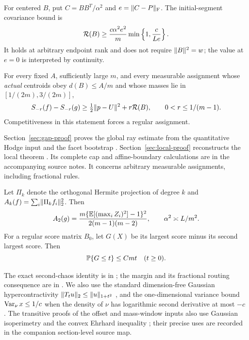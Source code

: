 \begin{prior}
\label{prior:local-global}
For centered $B$, put $C=BB^T/\alpha^2$ and $e=\lVert C-P\rVert_{\mathrm F}$.
The initial-segment covariance bound is
\begin{equation}\label{eq:global-covariance-floor}
 \mathcal R(B)\ge \frac{c\alpha^2e^2}{m}
                   \min\left\{1,\frac{c}{Le}\right\}.
\end{equation}
It holds at arbitrary endpoint rank and does not require
$\lVert B\rVert^2=w$; the value at $e=0$ is interpreted by continuity.

For every fixed $A$, sufficiently large $m$, and every measurable
assignment whose \emph{actual} centroids obey $d(B)\le A/m$ and whose
masses lie in $[1/(2m),3/(2m)]$,
\begin{equation}\label{eq:local-noise}
 S_{-r}(f)-S_{-r}(g)\ge \tfrac12\lVert p-U\rVert^2+r\mathcal R(B),
                   \qquad0<r\le1/(m-1).
\end{equation}
Competitiveness in this statement forces a regular assignment.
\end{prior}
Section~\ref{sec:gap-proof} proves the global ray estimate from the
quantitative Hodge input and the facet bootstrap \cite{currentgap}.
Section~\ref{sec:local-proof} reconstructs the local theorem
\cite{currentlocal}. Its complete cap and affine-boundary calculations are
in the accompanying source notes. It concerns arbitrary measurable
assignments, including fractional rules.

\begin{prior}
\label{prior:regular}
Let $\Pi_k$ denote the orthogonal Hermite projection of degree $k$ and
$A_k(f)=\sum_i\lVert \Pi_k f_i\rVert_2^2$. Then
\begin{equation}\label{eq:A2-reference}
 A_2(g)=\frac{m\{\mathbb E[(\max_i Z_i)^2]-1\}^2}{2(m-1)(m-2)},
 \qquad \alpha^2\asymp L/m^2.
\end{equation}
For a regular score matrix $B_0$, let $G(X)$ be its largest score minus
its second largest score. Then
\begin{equation}\label{eq:regular-margin}
                        \mathbb P\{G\le t\}\le Cmt\quad(t\ge0).
\end{equation}
\end{prior}
The exact second-chaos identity is in \cite{localization}; the margin
and its fractional routing consequence are in \cite{globaltail}.
We also use the standard dimension-free Gaussian hypercontractivity
$\lVert T_tu\rVert_2\le\lVert u\rVert_{1+t^2}$ \cite{Gross}, and the one-dimensional variance
bound $\operatorname{Var}_\nu x\le1/c$ when the density of $\nu$ has logarithmic
second derivative at most $-c$ \cite{BrascampLieb}. The transitive proofs
of the offset and mass-window inputs also use Gaussian isoperimetry
\cite{Borell} and the convex Ehrhard inequality \cite{Latala}; their
precise uses are recorded in the companion section-level source map.

